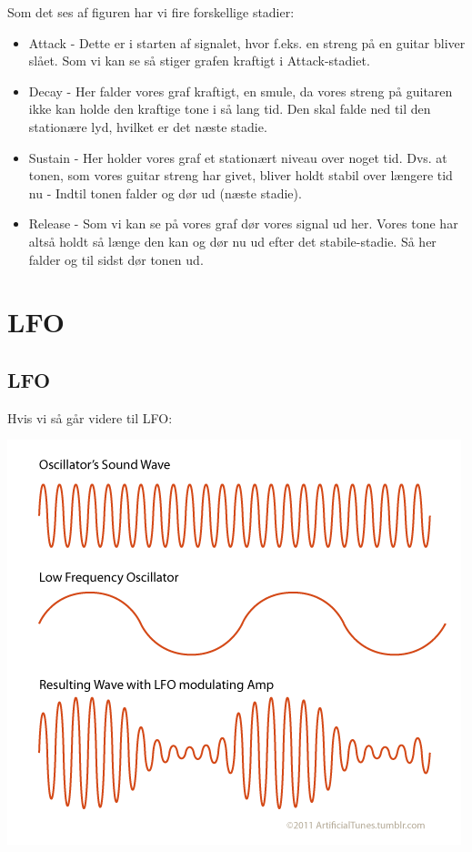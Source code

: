 \documentclass[12pt, letterpaper]{article}
\begin{document}
Som det ses af figuren har vi fire forskellige stadier: 
\begin{itemize}
\item Attack - Dette er i starten af signalet, hvor f.eks. en streng på en guitar bliver slået. Som vi kan se så stiger grafen kraftigt i Attack-stadiet. 
\item Decay - Her falder vores graf kraftigt, en smule, da vores streng på guitaren ikke kan holde den kraftige tone i så lang tid. Den skal falde ned til den stationære lyd, hvilket er det næste stadie.  
\item Sustain - Her holder vores graf et stationært niveau over noget tid. Dvs. at tonen, som vores guitar streng har givet, bliver holdt stabil over længere tid nu - Indtil tonen falder og dør ud (næste stadie). 
\item Release - Som vi kan se på vores graf dør vores signal ud her. Vores tone har altså holdt så længe den kan og dør nu ud efter det stabile-stadie. Så her falder og til sidst dør tonen ud. 
\end{itemize}


\section{LFO}

\subsection{LFO}

Hvis vi så går videre til LFO: 

\begin{center}
\includegraphics[width=\textwidth]{billeder/LFO}
\end{center}
\end{document}
